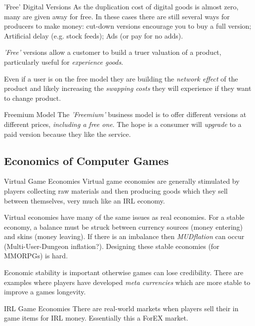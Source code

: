 \documentclass[11pt,a4paper]{article}
\begin{document}
\begin{remark}{'Free' Digital Versions}
  As the duplication cost of digital goods is almost zero, many are given away for free. In these cases there are still several ways for producers to make money: cut-down versions encourage you to buy a full version; Artificial delay (e.g. stock feeds); Ads (or pay for no adds).
  \par \textit{'Free'} versions allow a customer to build a truer valuation of a product, particularly useful for \textit{experience goods}.
  \par Even if a user is on the free model they are building the \textit{network effect} of the product and likely increasing the \textit{swapping costs} they will experience if they want to change product.
\end{remark}

\begin{proposition}{Freemium Model}
  The \textit{'Freemium'} business model is to offer different versions at different prices, \textit{including a free one}. The hope is a consumer will \textit{upgrade} to a paid version because they like the service.
\end{proposition}

\subsection{Economics of Computer Games}

\begin{proposition}{Virtual Game Economies}
  Virtual game economies are generally stimulated by players collecting raw materials and then producing goods which they sell between themselves, very much like an IRL economy.
  \par Virtual economies have many of the same issues as real economies. For a stable economy, a balance must be struck between currency sources (money entering) and skins (money leaving). If there is an imbalance then \textit{MUDflation} can occur (Multi-User-Dungeon inflation?). Designing these stable economies (for MMORPGs) is hard.
  \par Economic stability is important otherwise games can lose credibility. There are examples where players have developed \textit{meta currencies} which are more stable to improve a games longevity.
\end{proposition}

\begin{remark}{IRL Game Economies}
  There are real-world markets when players sell their in game items for IRL money. Essentially this a ForEX market.
\end{remark}
\end{document}
